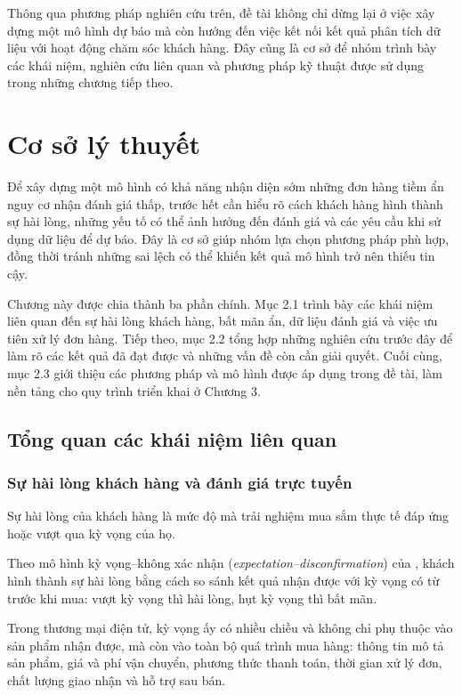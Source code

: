 \documentclass[12pt,a4paper]{report}
\begin{document}
Thông qua phương pháp nghiên cứu trên, đề tài không chỉ dừng lại ở việc xây dựng một mô hình dự báo mà còn hướng đến việc kết nối kết quả phân tích dữ liệu với hoạt động chăm sóc khách hàng. Đây cũng là cơ sở để nhóm trình bày các khái niệm, nghiên cứu liên quan và phương pháp kỹ thuật được sử dụng trong những chương tiếp theo.

\chapter{Cơ sở lý thuyết}\label{ch:theory}

Để xây dựng một mô hình có khả năng nhận diện sớm những đơn hàng tiềm ẩn nguy cơ nhận đánh giá thấp, trước hết cần hiểu rõ cách khách hàng hình thành sự hài lòng, những yếu tố có thể ảnh hưởng đến đánh giá và các yêu cầu khi sử dụng dữ liệu để dự báo. Đây là cơ sở giúp nhóm lựa chọn phương pháp phù hợp, đồng thời tránh những sai lệch có thể khiến kết quả mô hình trở nên thiếu tin cậy.

Chương này được chia thành ba phần chính. Mục 2.1 trình bày các khái niệm liên quan đến sự hài lòng khách hàng, bất mãn ẩn, dữ liệu đánh giá và việc ưu tiên xử lý đơn hàng. Tiếp theo, mục 2.2 tổng hợp những nghiên cứu trước đây để làm rõ các kết quả đã đạt được và những vấn đề còn cần giải quyết. Cuối cùng, mục 2.3 giới thiệu các phương pháp và mô hình được áp dụng trong đề tài, làm nền tảng cho quy trình triển khai ở Chương 3.

\section{Tổng quan các khái niệm liên quan}\label{sec:concepts}

\subsection{Sự hài lòng khách hàng và đánh giá trực tuyến}\label{sec:con-satisfaction}

Sự hài lòng của khách hàng là mức độ mà trải nghiệm mua sắm thực tế đáp ứng hoặc vượt qua kỳ vọng của họ. {\sloppy Theo mô hình kỳ vọng--không xác nhận (\emph{expectation--\allowbreak disconfirmation}) của \textcite{oliver1980}, khách hình thành sự hài lòng bằng cách so sánh kết quả nhận được với kỳ vọng có từ trước khi mua: vượt kỳ vọng thì hài lòng, hụt kỳ vọng thì bất mãn.\par} Trong thương mại điện tử, kỳ vọng ấy có nhiều chiều và không chỉ phụ thuộc vào sản phẩm nhận được, mà còn vào toàn bộ quá trình mua hàng: thông tin mô tả sản phẩm, giá và phí vận chuyển, phương thức thanh toán, thời gian xử lý đơn, chất lượng giao nhận và hỗ trợ sau bán.
\end{document}
